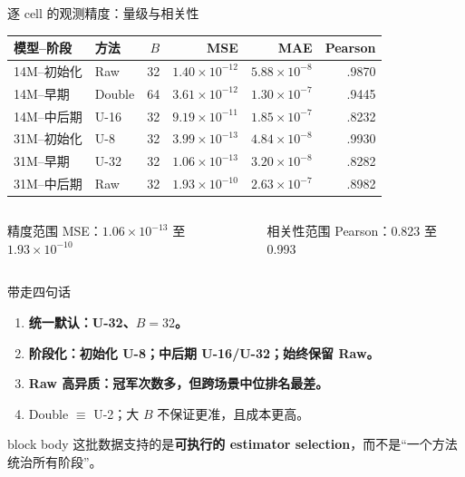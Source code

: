 \documentclass[10pt,aspectratio=169]{beamer}
\newcommand{\best}[1]{\textcolor{secondary}{\textbf{#1}}}
\newcommand{\keypoint}[1]{\textcolor{good}{\textbf{#1}}}
\newcommand{\caution}[1]{\textcolor{accent}{\textbf{#1}}}
\begin{document}
\begin{frame}{逐 cell 的观测精度：量级与相关性}
  \small
  \centering
  \begin{tabular}{llrrrr}
    \toprule
    模型--阶段 & 方法 & $B$ & MSE & MAE & Pearson \\
    \midrule
    14M--初始化 & Raw & 32 & $1.40{\times}10^{-12}$ & $5.88{\times}10^{-8}$ & .9870 \\
    14M--早期 & Double & 64 & $3.61{\times}10^{-12}$ & $1.30{\times}10^{-7}$ & .9445 \\
    14M--中后期 & U-16 & 32 & $9.19{\times}10^{-11}$ & $1.85{\times}10^{-7}$ & .8232 \\
    31M--初始化 & U-8 & 32 & $3.99{\times}10^{-13}$ & $4.84{\times}10^{-8}$ & .9930 \\
    31M--早期 & U-32 & 32 & $1.06{\times}10^{-13}$ & $3.20{\times}10^{-8}$ & .8282 \\
    31M--中后期 & Raw & 32 & $1.93{\times}10^{-10}$ & $2.63{\times}10^{-7}$ & .8982 \\
    \bottomrule
  \end{tabular}
  \vspace{3mm}
  \begin{columns}[T,onlytextwidth]
      \begin{block}{精度范围}
        MSE：$1.06{\times}10^{-13}$ 至 $1.93{\times}10^{-10}$
      \end{block}
      \begin{block}{相关性范围}
        Pearson：0.823 至 0.993
      \end{block}
  \end{columns}
\end{frame}

\begin{frame}{带走四句话}
  \begin{enumerate}
    \setlength{\itemsep}{7mm}
    \item \best{统一默认：U-32、$B=32$。}
    \item \keypoint{阶段化：初始化 U-8；中后期 U-16/U-32；始终保留 Raw。}
    \item \caution{Raw 高异质：冠军次数多，但跨场景中位排名最差。}
    \item Double $\equiv$ U-2；大 $B$ 不保证更准，且成本更高。
  \end{enumerate}
  \vspace{2mm}
  \begin{beamercolorbox}[rounded=true,sep=.8em]{block body}
    \centering
    这批数据支持的是\textbf{可执行的 estimator selection}，而不是“一个方法统治所有阶段”。
  \end{beamercolorbox}
\end{frame}
\end{document}
